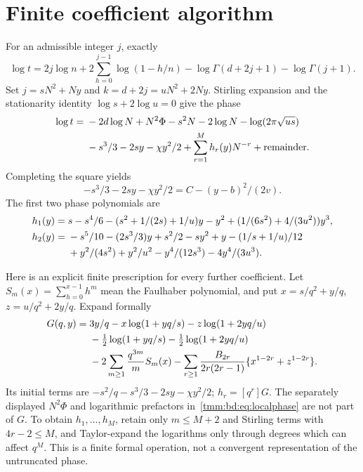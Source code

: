 \documentclass[11pt,letterpaper]{article}
\theoremstyle{remark}\newtheorem{remark}[theorem]{Remark}
\begin{document}
\section{Finite coefficient algorithm}\label{tmm:bd:sec:algorithm}
For an admissible integer $j$, exactly
\begin{equation}\label{tmm:bd:eq:logterm}
 \log t=2j\log n+2\sum_{h=0}^{j-1}\log(1-h/n)
         -\log\Gamma(d+2j+1)-\log\Gamma(j+1).
\end{equation}
Set $j=sN^2+Ny$ and $k=d+2j=uN^2+2Ny$. Stirling expansion and the stationarity identity $\log s+2\log u=0$ give the phase
\begin{align}
 \log t={}&-2d\log N+N^2\Phi-s^2N-2\log N-\log(2\pi\sqrt{us})\notag\\
 &-s^3/3-2sy-\chi y^2/2+\sum_{r=1}^Mh_r(y)N^{-r}
       +\text{remainder}.\label{tmm:bd:eq:localphase}
\end{align}
Completing the square yields
\[
 -s^3/3-2sy-\chi y^2/2=C-(y-b)^2/(2v).
\]
The first two phase polynomials are
\begin{align}
 h_1(y)={}&s-s^4/6-(s^2+1/(2s)+1/u)y-y^2
             +(1/(6s^2)+4/(3u^2))y^3,\label{tmm:bd:eq:h1}\\
 h_2(y)={}&-s^5/10-(2s^3/3)y+s^2/2-sy^2+y
             -(1/s+1/u)/12\notag\\
 &+y^2/(4s^2)+y^2/u^2-y^4/(12s^3)-4y^4/(3u^3).\label{tmm:bd:eq:h2}
\end{align}

Here is an explicit finite prescription for every further coefficient. Let $S_m(x)=\sum_{h=0}^{x-1}h^m$ mean the Faulhaber polynomial, and put $x=s/q^2+y/q$, $z=u/q^2+2y/q$. Expand formally
\begin{align}
 G(q,y)={}&3y/q-x\log(1+yq/s)-z\log(1+2yq/u)\notag\\
 &-\tfrac12\log(1+yq/s)-\tfrac12\log(1+2yq/u)\notag\\
 &-2\sum_{m\ge1}\frac{q^{3m}}mS_m(x)
 -\sum_{r\ge1}\frac{B_{2r}}{2r(2r-1)}
       \{x^{1-2r}+z^{1-2r}\}.\label{tmm:bd:eq:G}
\end{align}
Its initial terms are $-s^2/q-s^3/3-2sy-\chi y^2/2$; $h_r=[q^r]G$. The separately displayed $N^2\Phi$ and logarithmic prefactors in~\eqref{tmm:bd:eq:localphase} are not part of $G$. To obtain $h_1,\ldots,h_M$, retain only $m\le M+2$ and Stirling terms with $4r-2\le M$, and Taylor-expand the logarithms only through degrees which can affect $q^M$. This is a finite formal operation, not a convergent representation of the untruncated phase.
\end{document}

